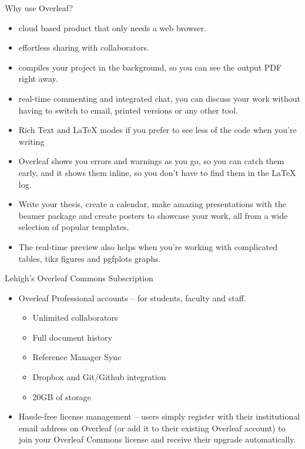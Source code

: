 \documentclass[style=njit,orient=landscape]{powerdot}
\begin{document}
\begin{slide}{Why use Overleaf?}
\begin{itemize}
    \item cloud based product that only needs a web browser.
    \item effortless sharing with collaborators.
    \item compiles your project in the background, so you can see the output PDF right away.
    \item real-time commenting and integrated chat, you can discuss your work without having to switch to email, printed versions or any other tool. 
    \item Rich Text and \LaTeX{} modes if you prefer to see less of the code when you’re writing
    \item Overleaf shows you errors and warnings as you go, so you can catch them early, and it shows them inline, so you don't have to find them in the \LaTeX{} log.
    \item Write your thesis, create a calendar, make amazing presentations with the beamer package and create posters to showcase your work, all from a wide selection of popular templates. 
    \item The real-time preview also helps when you're working with complicated tables, tikz figures and pgfplots graphs.
\end{itemize}
\end{slide}

\begin{slide}{Lehigh's Overleaf Commons Subscription}
\begin{itemize}
    \item Overleaf Professional accounts – for students, faculty and staff.
    \begin{itemize}
        \item Unlimited collaborators 
        \item Full document history
        \item Reference Manager Sync
        \item Dropbox and Git/Github integration
        \item 20GB of storage
    \end{itemize}
    \item Hassle-free license management – users simply register with their institutional email address on Overleaf (or add it to their existing Overleaf account) to join your Overleaf Commons license and receive their upgrade automatically.
\end{itemize}
\end{slide}
\end{document}
